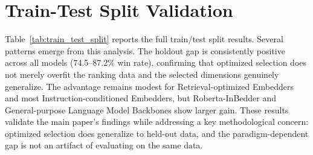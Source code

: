 \documentclass[11pt,a4paper]{article}
\begin{document}
\begin{table}[h]
    \centering
    \caption{Per-task importance definition comparison for Roberta-Large (chunk size=4, retained dimension=256). Spearman correlations and normalized entropy for standalone, Leave-one-out, marginal, and Shapley importance. Low standalone-to-alternative correlations confirm importance is context-dependent.}
    \label{tab:loo_detailed}
    \small
\end{table}

\section{Train-Test Split Validation}
\label{sec:train_test_split}

Table~\ref{tab:train_test_split} reports the full train/test split results. Several patterns emerge from this analysis. The holdout gap is consistently positive across all models (74.5--87.2\% win rate), confirming that optimized selection does not merely overfit the ranking data and the selected dimensions genuinely generalize. The advantage remains modest for Retrieval-optimized Embedders and most Instruction-conditioned Embedders, but Roberta-InBedder and General-purpose Language Model Backbones show larger gain. These results validate the main paper's findings while addressing a key methodological concern: optimized selection does generalize to held-out data, and the paradigm-dependent gap is not an artifact of evaluating on the same data.
\end{document}
